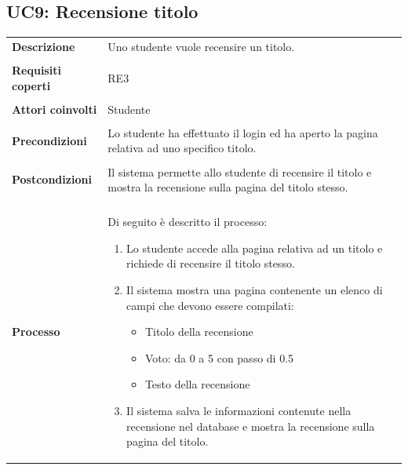 \documentclass[10pt,a4paper]{article}
\begin{document}
	\subsection{UC9: Recensione titolo}
	\begin{tabular}{lp{}}
		\textbf{Descrizione}&Uno studente vuole recensire un titolo.\\
		\\
		\textbf{Requisiti coperti}&RE3\\
		\\
		\textbf{Attori coinvolti}&Studente\\
		\\
		\textbf{Precondizioni}&Lo studente ha effettuato il login ed ha aperto la pagina relativa ad uno specifico titolo.\\
		\\
		\textbf{Postcondizioni}&Il sistema permette allo studente di recensire il titolo e mostra la recensione sulla pagina del titolo stesso.\\
		\\
		\textbf{Processo}&Di seguito è descritto il processo:
		\begin{enumerate}
			\item Lo studente accede alla pagina relativa ad un titolo e richiede di recensire il titolo stesso.
			\item Il sistema mostra una pagina contenente un elenco di campi che devono essere compilati:
			\begin{itemize}
				\item Titolo della recensione
				\item Voto: da 0 a 5 con passo di 0.5
				\item Testo della recensione
			\end{itemize}
			\item Il sistema salva le informazioni contenute nella recensione nel database e mostra la recensione sulla pagina del titolo.
		\end{enumerate}
	\end{tabular}
\end{document}
